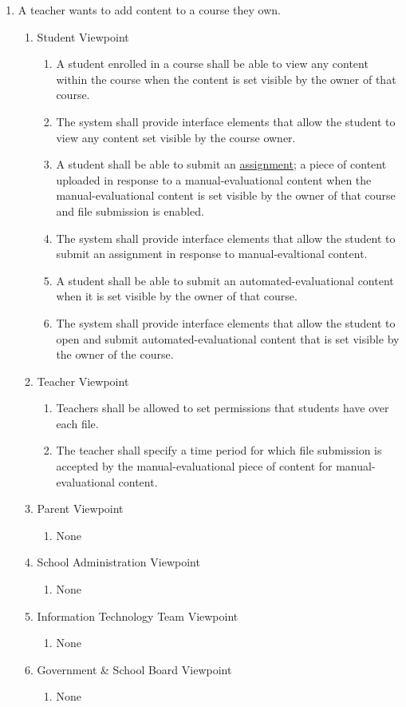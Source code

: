 \documentclass[]{article}
\begin{document}
\begin{enumerate}[{BE}1.]
	\item A teacher wants to add content to a course they own.
	\begin{enumerate}[{VP1}.1]
		\item Student Viewpoint
			\begin{enumerate}
        \item A student enrolled in a course shall be able to view any content within the course when the content is set visible by the owner of that course.
        \item The system shall provide interface elements that allow the student to view any content set visible by the course owner.
        \item A student shall be able to submit an \underline{assignment}; a piece of content uploaded in response to a manual-evaluational content when the manual-evaluational content is set visible by the owner of that course and file submission is enabled.
        \item The system shall provide interface elements that allow the student to submit an assignment in response to manual-evaltional content.
        \item A student shall be able to submit an automated-evaluational content when it is set visible by the owner of that course.
        \item The system shall provide interface elements that allow the student to open and submit automated-evaluational content that is set visible by the owner of the course.
			\end{enumerate}
		\item Teacher Viewpoint
			\begin{enumerate}
				\item Teachers shall be allowed to set permissions that students have over each file.
				\item The teacher shall specify a time period for which file submission is accepted by the manual-evaluational piece of content for manual-evaluational content.
			\end{enumerate}
		\item Parent Viewpoint
			\begin{enumerate}
				\item None
			\end{enumerate}
		\item School Administration Viewpoint
			\begin{enumerate}
				\item None
			\end{enumerate}
		\item Information Technology Team Viewpoint
			\begin{enumerate}
				\item None
			\end{enumerate}
		\item Government \& School Board Viewpoint
			\begin{enumerate}
				\item None
			\end{enumerate}
	\end{enumerate}


\end{enumerate}
\end{document}
